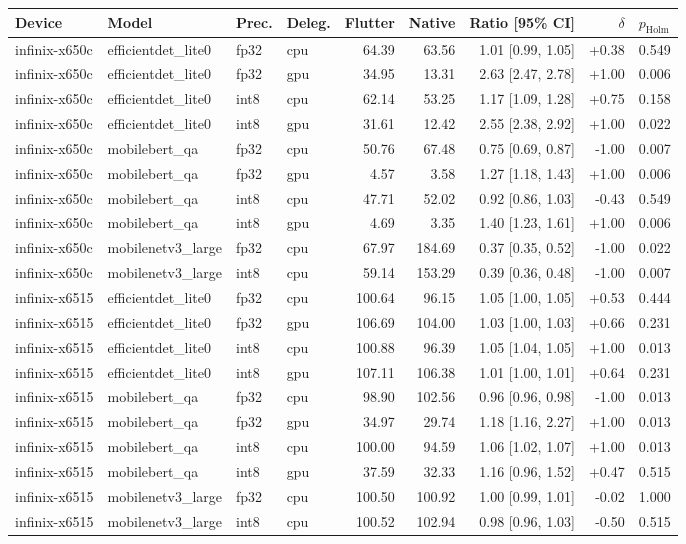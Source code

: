 \begin{tabular}{llllrrrrl}
\toprule
Device & Model & Prec. & Deleg. & Flutter & Native & Ratio [95\% CI] & $\delta$ & $p_{\mathrm{Holm}}$ \\
\midrule
infinix-x650c & efficientdet\_lite0 & fp32 & cpu & 64.39 & 63.56 & 1.01 [0.99, 1.05] & +0.38 & 0.549 \\
infinix-x650c & efficientdet\_lite0 & fp32 & gpu & 34.95 & 13.31 & 2.63 [2.47, 2.78] & +1.00 & 0.006 \\
infinix-x650c & efficientdet\_lite0 & int8 & cpu & 62.14 & 53.25 & 1.17 [1.09, 1.28] & +0.75 & 0.158 \\
infinix-x650c & efficientdet\_lite0 & int8 & gpu & 31.61 & 12.42 & 2.55 [2.38, 2.92] & +1.00 & 0.022 \\
infinix-x650c & mobilebert\_qa & fp32 & cpu & 50.76 & 67.48 & 0.75 [0.69, 0.87] & -1.00 & 0.007 \\
infinix-x650c & mobilebert\_qa & fp32 & gpu & 4.57 & 3.58 & 1.27 [1.18, 1.43] & +1.00 & 0.006 \\
infinix-x650c & mobilebert\_qa & int8 & cpu & 47.71 & 52.02 & 0.92 [0.86, 1.03] & -0.43 & 0.549 \\
infinix-x650c & mobilebert\_qa & int8 & gpu & 4.69 & 3.35 & 1.40 [1.23, 1.61] & +1.00 & 0.006 \\
infinix-x650c & mobilenetv3\_large & fp32 & cpu & 67.97 & 184.69 & 0.37 [0.35, 0.52] & -1.00 & 0.022 \\
infinix-x650c & mobilenetv3\_large & int8 & cpu & 59.14 & 153.29 & 0.39 [0.36, 0.48] & -1.00 & 0.007 \\
infinix-x6515 & efficientdet\_lite0 & fp32 & cpu & 100.64 & 96.15 & 1.05 [1.00, 1.05] & +0.53 & 0.444 \\
infinix-x6515 & efficientdet\_lite0 & fp32 & gpu & 106.69 & 104.00 & 1.03 [1.00, 1.03] & +0.66 & 0.231 \\
infinix-x6515 & efficientdet\_lite0 & int8 & cpu & 100.88 & 96.39 & 1.05 [1.04, 1.05] & +1.00 & 0.013 \\
infinix-x6515 & efficientdet\_lite0 & int8 & gpu & 107.11 & 106.38 & 1.01 [1.00, 1.01] & +0.64 & 0.231 \\
infinix-x6515 & mobilebert\_qa & fp32 & cpu & 98.90 & 102.56 & 0.96 [0.96, 0.98] & -1.00 & 0.013 \\
infinix-x6515 & mobilebert\_qa & fp32 & gpu & 34.97 & 29.74 & 1.18 [1.16, 2.27] & +1.00 & 0.013 \\
infinix-x6515 & mobilebert\_qa & int8 & cpu & 100.00 & 94.59 & 1.06 [1.02, 1.07] & +1.00 & 0.013 \\
infinix-x6515 & mobilebert\_qa & int8 & gpu & 37.59 & 32.33 & 1.16 [0.96, 1.52] & +0.47 & 0.515 \\
infinix-x6515 & mobilenetv3\_large & fp32 & cpu & 100.50 & 100.92 & 1.00 [0.99, 1.01] & -0.02 & 1.000 \\
infinix-x6515 & mobilenetv3\_large & int8 & cpu & 100.52 & 102.94 & 0.98 [0.96, 1.03] & -0.50 & 0.515 \\
\bottomrule
\end{tabular}
